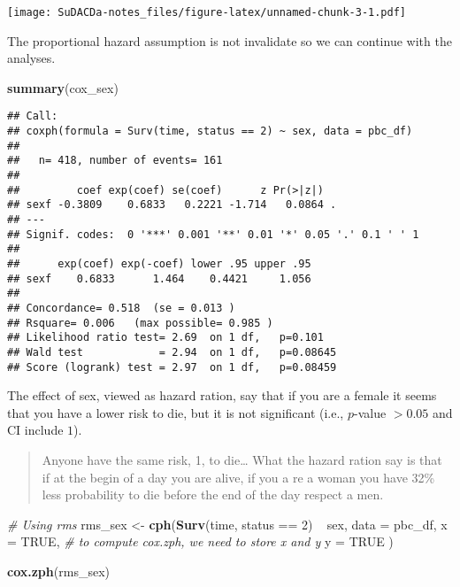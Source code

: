 \documentclass[]{book}
\newenvironment{Shaded}{\begin{snugshade}}{\end{snugshade}}
\newcommand{\KeywordTok}[1]{\textcolor[rgb]{0.13,0.29,0.53}{\textbf{{#1}}}}
\newcommand{\DataTypeTok}[1]{\textcolor[rgb]{0.13,0.29,0.53}{{#1}}}
\newcommand{\DecValTok}[1]{\textcolor[rgb]{0.00,0.00,0.81}{{#1}}}
\newcommand{\StringTok}[1]{\textcolor[rgb]{0.31,0.60,0.02}{{#1}}}
\newcommand{\CommentTok}[1]{\textcolor[rgb]{0.56,0.35,0.01}{\textit{{#1}}}}
\newcommand{\OtherTok}[1]{\textcolor[rgb]{0.56,0.35,0.01}{{#1}}}
\newcommand{\NormalTok}[1]{{#1}}
\theoremstyle{definition}
\theoremstyle{definition}
\theoremstyle{definition}
\theoremstyle{remark}
\begin{document}
\texttt{[image: SuDACDa-notes\_files/figure-latex/unnamed-chunk-3-1.pdf]}

The proportional hazard assumption is not invalidate so we can continue
with the analyses.

\begin{Shaded}
\begin{Highlighting}[]
\KeywordTok{summary}\NormalTok{(cox_sex)}
\end{Highlighting}
\end{Shaded}

\begin{verbatim}
## Call:
## coxph(formula = Surv(time, status == 2) ~ sex, data = pbc_df)
## 
##   n= 418, number of events= 161 
## 
##         coef exp(coef) se(coef)      z Pr(>|z|)  
## sexf -0.3809    0.6833   0.2221 -1.714   0.0864 .
## ---
## Signif. codes:  0 '***' 0.001 '**' 0.01 '*' 0.05 '.' 0.1 ' ' 1
## 
##      exp(coef) exp(-coef) lower .95 upper .95
## sexf    0.6833      1.464    0.4421     1.056
## 
## Concordance= 0.518  (se = 0.013 )
## Rsquare= 0.006   (max possible= 0.985 )
## Likelihood ratio test= 2.69  on 1 df,   p=0.101
## Wald test            = 2.94  on 1 df,   p=0.08645
## Score (logrank) test = 2.97  on 1 df,   p=0.08459
\end{verbatim}

The effect of sex, viewed as hazard ration, say that if you are a female
it seems that you have a lower risk to die, but it is not significant
(i.e., \(p\)-value \(> 0.05\) and CI include \(1\)).

\begin{quote}
Anyone have the same risk, 1, to die\ldots{} What the hazard ration say
is that if at the begin of a day you are alive, if you a re a woman you
have 32\% less probability to die before the end of the day respect a
men.
\end{quote}

\begin{Shaded}
\begin{Highlighting}[]
\CommentTok{# Using rms}
\NormalTok{rms_sex <-}\StringTok{ }\KeywordTok{cph}\NormalTok{(}\KeywordTok{Surv}\NormalTok{(time, status ==}\StringTok{ }\DecValTok{2}\NormalTok{) ~}\StringTok{ }\NormalTok{sex,}
  \DataTypeTok{data =} \NormalTok{pbc_df,}
  \DataTypeTok{x    =} \OtherTok{TRUE}\NormalTok{,                    }\CommentTok{# to compute cox.zph, we need to store x and y}
  \DataTypeTok{y    =} \OtherTok{TRUE}
\NormalTok{)}

\KeywordTok{cox.zph}\NormalTok{(rms_sex)}
\end{Highlighting}
\end{Shaded}
\end{document}
